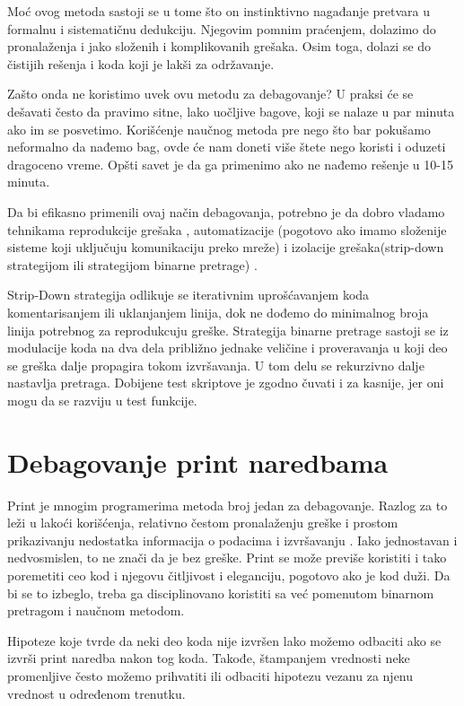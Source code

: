 \documentclass[a4paper]{article}
\begin{document}
	Moć ovog metoda sastoji se u tome što on instinktivno nagađanje pretvara u formalnu i sistematičnu dedukciju. Njegovim pomnim praćenjem, dolazimo do pronalaženja i jako složenih i komplikovanih grešaka. Osim toga, dolazi se do čistijih rešenja i koda koji je lakši za održavanje.
	
	Zašto onda ne koristimo uvek ovu metodu za debagovanje? \cite{proPyDeb} U praksi će se dešavati često da pravimo sitne, lako uočljive bagove, koji se nalaze u par minuta ako im se posvetimo. Korišćenje naučnog metoda pre nego što bar pokušamo neformalno da nađemo bag, ovde će nam doneti više štete nego koristi i oduzeti dragoceno vreme. Opšti savet je da ga primenimo ako ne nađemo rešenje u 10-15 minuta.
	
	Da bi efikasno primenili ovaj način debagovanja, potrebno je da dobro vladamo tehnikama reprodukcije grešaka \cite{proPyDeb}, automatizacije (pogotovo ako imamo složenije sisteme koji uključuju komunikaciju preko mreže) i izolacije grešaka(strip-down strategijom ili strategijom binarne pretrage) \cite{proPyDeb}.
	
	Strip-Down strategija odlikuje se iterativnim uprošćavanjem koda komentarisanjem ili uklanjanjem linija, dok ne dođemo do minimalnog broja linija potrebnog za  reprodukcuju greške. Strategija binarne pretrage sastoji se iz modulacije koda na dva dela približno jednake veličine i proveravanja u koji deo se greška dalje propagira tokom izvršavanja. U tom delu se rekurzivno dalje nastavlja pretraga. Dobijene test skriptove je zgodno čuvati i za kasnije, jer oni mogu da se razviju u test funkcije\cite{proPyDeb}.

\section{Debagovanje print naredbama}
Print je mnogim programerima metoda broj jedan za debagovanje. Razlog za to leži u lakoći korišćenja, relativno čestom pronalaženju greške i prostom prikazivanju nedostatka informacija o podacima i izvršavanju \cite{proPyDeb}. Iako jednostavan i nedvosmislen, to ne znači da je bez greške. Print se može previše koristiti i tako poremetiti ceo kod i njegovu čitljivost i eleganciju, pogotovo ako je kod duži. Da bi se to izbeglo, treba ga disciplinovano koristiti sa već pomenutom binarnom pretragom i naučnom metodom.

Hipoteze koje tvrde da neki deo koda nije izvršen lako možemo odbaciti ako se izvrši print naredba nakon tog koda. Takođe, štampanjem vrednosti neke promenljive često možemo prihvatiti ili odbaciti hipotezu vezanu za njenu vrednost u određenom trenutku. 
\end{document}

